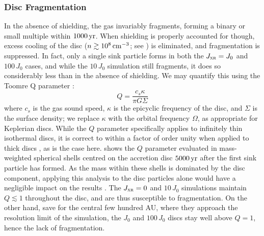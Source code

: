 \documentclass[../thesis.tex]{subfiles}
\begin{document}
\subsubsection{Disc Fragmentation}
\label{fragmentation}
In the absence of shielding, the gas invariably fragments, forming a binary or small multiple within $1000\,\mathrm{yr}$.  When shielding is properly accounted for though, excess cooling of the disc ($n\gtrsim10^8\,\mathrm{cm}^{-3}$; see ) is eliminated, and fragmentation is suppressed.  In fact, only a single sink particle forms in both the $J_{\textsc{xr}}=J_0$ and $100\,J_0$ cases, and while the $10\,J_0$ simulation still fragments, it does so considerably less than in the absence of shielding.  We may quantify this using the Toomre Q parameter \citep{Toomre1964}: 
\begin{equation}
Q = \frac{c_s \kappa}{\pi G \Sigma}
\end{equation}
where $c_s$ is the gas sound speed, $\kappa$ is the epicyclic frequency of the disc, and $\Sigma$ is the surface density; we replace $\kappa$ with the orbital frequency $\Omega$, as appropriate for Keplerian discs.  While the $Q$ parameter specifically applies to infinitely thin isothermal discs, it is correct to within a factor of order unity when applied to thick discs \citep{Wangetal2010}, as is the case here.  shows the $Q$ parameter evaluated in mass-weighted spherical shells centred on the accretion disc $5000\,\mathrm{yr}$ after the first sink particle has formed.  As the mass within these shells is dominated by the disc component, applying this analysis to the disc particles alone would have a negligible impact on the results \citep[e.g.,][]{Greifetal2012}.  The $J_{\textsc{xr}}=0$ and $10\,J_0$ simulations maintain $Q\lesssim1$ throughout the disc, and are thus susceptible to fragmentation.  On the other hand, save for the central few hundred AU, where they approach the resolution limit of the simulation, the $J_0$ and $100\,J_0$ discs stay well above $Q=1$, hence the lack of fragmentation.
\end{document}
